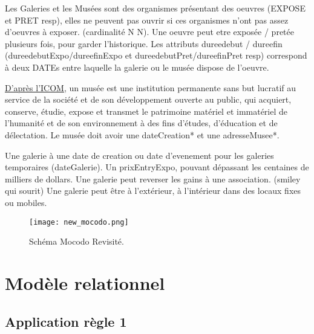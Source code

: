 \documentclass{article}
\begin{document}
Les Galeries et les Musées sont des organismes présentant des oeuvres (EXPOSE et PRET resp),
elles ne peuvent pas ouvrir si ces organismes n'ont pas assez d'oeuvres à exposer. 
(cardinalité N N).
Une oeuvre peut etre exposée / pretée plusieurs fois, pour garder l'historique.
Les attributs dureedebut / dureefin (dureedebutExpo/dureefinExpo et dureedebutPret/dureefinPret resp) correspond à deux DATEs entre laquelle la galerie ou le musée dispose de l'oeuvre.


\href{https://fr.wikipedia.org/wiki/Musée}{D'après l'ICOM}, un musée est une institution permanente sans but lucratif au service de la société et de son développement ouverte au public, qui acquiert, conserve, étudie, expose et transmet le patrimoine matériel et immatériel de l’humanité et de son environnement à des fins d'études, d'éducation et de délectation. 
Le musée doit avoir une dateCreation* et une adresseMusee*.

Une galerie à une date de creation ou date d'evenement pour les galeries temporaires (dateGalerie).
Un prixEntryExpo, pouvant dépassant les centaines de milliers de dollars.
Une galerie peut reverser les gains à une association. (smiley qui sourit)
Une galerie peut être à l'extérieur, à l'intérieur dans des locaux fixes ou mobiles.




\begin{figure}[htp]
\centering
\texttt{[image: new\_mocodo.png]}
\caption{\label{fig:MCD_last}Schéma Mocodo Revisité.}
\end{figure}


\clearpage


\section{Modèle relationnel}
\subsection{Application règle 1}
\end{document}
